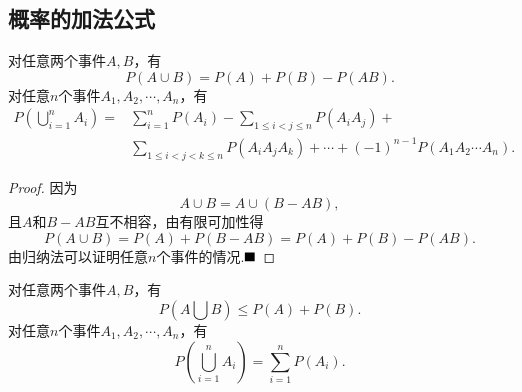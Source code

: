 \subsection{概率的加法公式}
\begin{theorem}
	对任意两个事件$A,B$，有
	$$P(A\cup B)=P(A)+P(B)-P(AB).$$
	对任意$n$个事件$A_1,A_2,\cdots,A_n$，有
	\begin{align*}
		P\left(\bigcup_{i=1}^{n}A_i\right)=
		&\sum_{i=1}^{n}P(A_i)-\sum_{1\leqslant i<j\leqslant n}P(A_iA_j)+\\
		&\sum_{1\leqslant i<j<k\leqslant n}P(A_iA_jA_k)+\cdots+(-1)^{n-1}P(A_1A_2\cdots A_n).
	\end{align*}
\end{theorem}
\begin{proof}
	因为
	$$A\cup B=A\cup (B-AB),$$
	且$A$和$B-AB$互不相容，由有限可加性得
	$$P(A\cup B)=P(A)+P(B-AB)=P(A)+P(B)-P(AB).$$
	由归纳法可以证明任意$n$个事件的情况.$\hfill\blacksquare$
\end{proof}
\begin{corollary}[半可加性]
	对任意两个事件$A,B$，有
	$$P(A\bigcup B)\leqslant P(A)+P(B).$$
	对任意$n$个事件$A_1,A_2,\cdots,A_n$，有
	$$P\left(\bigcup_{i=1}^{n}A_i\right)=\sum_{i=1}^{n}P(A_i).$$
\end{corollary}
